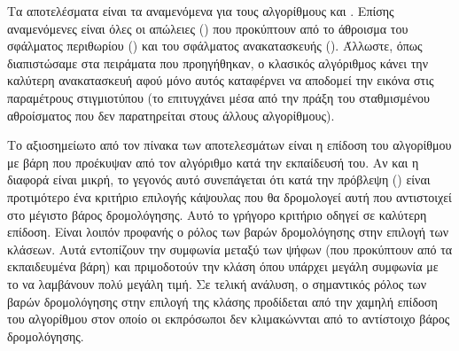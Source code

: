 \begin{table}[h]
    \begin{center}
    \end{center}
    \caption[]{\label{tab:special_experiments_algorithms_on_classic_model}Πειράματα στο  με την εκπαίδευση του αλγορίθμου στον κλασσικό, δυναμικό αλγόριθμο ρομολόγησης με συμφωνία και τον έλεγχο του μοντέλου αυτού με τη χρήση των τεσσάρων αλγορίθμων δρομολόγησης.}
\end{table}

Τα αποτελέσματα είναι τα αναμενόμενα για τους αλγορίθμους  και . Επίσης αναμενόμενες είναι όλες οι απώλειες () που προκύπτουν από το άθροισμα του σφάλματος περιθωρίου () και του σφάλματος ανακατασκευής (). Άλλωστε, όπως διαπιστώσαμε στα πειράματα που προηγήθηκαν, ο κλασικός αλγόριθμος κάνει την καλύτερη ανακατασκευή αφού μόνο αυτός καταφέρνει να αποδομεί την εικόνα στις παραμέτρους στιγμιοτύπου (το επιτυγχάνει μέσα από την πράξη του σταθμισμένου αθροίσματος που δεν παρατηρείται στους άλλους αλγορίθμους).\par 

Το αξιοσημείωτο από τον πίνακα των αποτελεσμάτων είναι η επίδοση του αλγορίθμου  με βάρη που προέκυψαν από τον αλγόριθμο  κατά την εκπαίδευσή του. Αν και η διαφορά είναι μικρή, το γεγονός αυτό συνεπάγεται ότι κατά την πρόβλεψη () είναι προτιμότερο ένα κριτήριο επιλογής κάψουλας που θα δρομολογεί αυτή που αντιστοιχεί στο μέγιστο βάρος δρομολόγησης. Αυτό το γρήγορο κριτήριο οδηγεί σε καλύτερη επίδοση. Είναι λοιπόν προφανής ο ρόλος των βαρών δρομολόγησης στην επιλογή των κλάσεων. Αυτά εντοπίζουν την συμφωνία μεταξύ των ψήφων (που προκύπτουν από τα εκπαιδευμένα βάρη) και πριμοδοτούν την κλάση όπου υπάρχει μεγάλη συμφωνία με το να λαμβάνουν πολύ μεγάλη τιμή. Σε τελική ανάλυση, ο σημαντικός ρόλος των βαρών δρομολόγησης στην επιλογή της κλάσης προδίδεται από την χαμηλή επίδοση του αλγορίθμου  στον οποίο οι εκπρόσωποι δεν κλιμακώννται από το αντίστοιχο βάρος δρομολόγησης.\par



